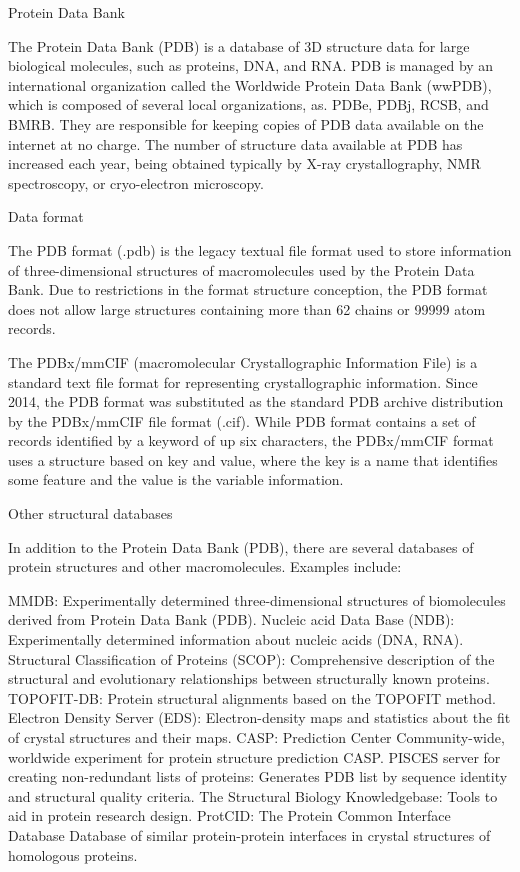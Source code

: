 Protein Data Bank

The Protein Data Bank (PDB) is a database of 3D structure data for large biological molecules, such as proteins, DNA, and RNA. PDB is managed by an international organization called the Worldwide Protein Data Bank (wwPDB), which is composed of several local organizations, as. PDBe, PDBj, RCSB, and BMRB. They are responsible for keeping copies of PDB data available on the internet at no charge. The number of structure data available at PDB has increased each year, being obtained typically by X-ray crystallography, NMR spectroscopy, or cryo-electron microscopy.

Data format

The PDB format (.pdb) is the legacy textual file format used to store information of three-dimensional structures of macromolecules used by the Protein Data Bank. Due to restrictions in the format structure conception, the PDB format does not allow large structures containing more than 62 chains or 99999 atom records.

The PDBx/mmCIF (macromolecular Crystallographic Information File) is a standard text file format for representing crystallographic information. Since 2014, the PDB format was substituted as the standard PDB archive distribution by the PDBx/mmCIF file format (.cif). While PDB format contains a set of records identified by a keyword of up six characters, the PDBx/mmCIF format uses a structure based on key and value, where the key is a name that identifies some feature and the value is the variable information.

Other structural databases

In addition to the Protein Data Bank (PDB), there are several databases of protein structures and other macromolecules. Examples include:

    MMDB: Experimentally determined three-dimensional structures of biomolecules derived from Protein Data Bank (PDB).
    Nucleic acid Data Base (NDB): Experimentally determined information about nucleic acids (DNA, RNA).
    Structural Classification of Proteins (SCOP): Comprehensive description of the structural and evolutionary relationships between structurally known proteins.
    TOPOFIT-DB: Protein structural alignments based on the TOPOFIT method.
    Electron Density Server (EDS): Electron-density maps and statistics about the fit of crystal structures and their maps.
    CASP: Prediction Center Community-wide, worldwide experiment for protein structure prediction CASP.
    PISCES server for creating non-redundant lists of proteins: Generates PDB list by sequence identity and structural quality criteria.
    The Structural Biology Knowledgebase: Tools to aid in protein research design.
    ProtCID: The Protein Common Interface Database Database of similar protein-protein interfaces in crystal structures of homologous proteins.
